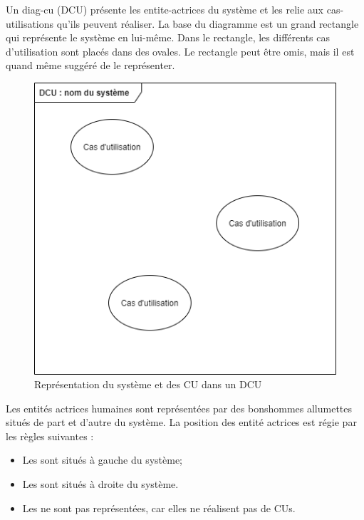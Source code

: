 \label{sec:cas-utilisation}

Un \gls{diag-cu} (\acrshort{DCU}) présente les \glspl{entite-actrice} du système et les relie aux \glspl{cas-utilisation} qu'ils peuvent réaliser. La base du diagramme est un grand rectangle qui représente le système en lui-même. Dans le rectangle, les différents cas d'utilisation sont placés dans des ovales. Le rectangle peut être omis, mais il est quand même suggéré de le représenter.

\begin{figure}[H]
	\caption{Représentation du système et des \acrshort{CU} dans un \acrshort{DCU}} 
	\centering
	\includegraphics[width=.7\textwidth]{cas-utilisation1.png}
\end{figure}

Les entités actrices humaines sont représentées par des bonshommes allumettes situés de part et d'autre du système. La position des entité actrices est régie par les règles suivantes :

\begin{itemize}
	\item Les  sont situés à gauche du système;
	\item Les  sont situés à droite du système.
	\item Les  ne sont pas représentées, car elles ne réalisent pas de \glspl{CU}.
\end{itemize}

\vfill

